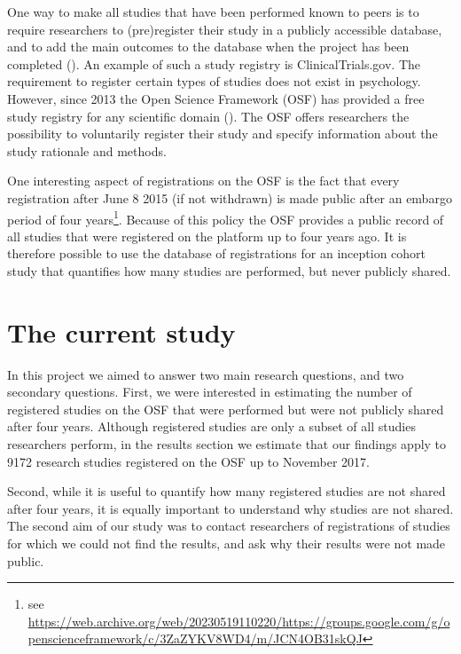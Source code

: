 \documentclass[
  ,man, a4paper,floatsintext]{apa6}
\begin{document}
One way to make all studies that have been performed known to peers is to require researchers to (pre)register their study in a publicly accessible database, and to add the main outcomes to the database when the project has been completed (). An example of such a study registry is ClinicalTrials.gov. The requirement to register certain types of studies does not exist in psychology. However, since 2013 the Open Science Framework (OSF) has provided a free study registry for any scientific domain (). The OSF offers researchers the possibility to voluntarily register their study and specify information about the study rationale and methods.

One interesting aspect of registrations on the OSF is the fact that every registration after June 8 2015 (if not withdrawn) is made public after an embargo period of four years\footnote{see \url{https://web.archive.org/web/20230519110220/https://groups.google.com/g/openscienceframework/c/3ZaZYKV8WD4/m/JCN4OB31skQJ}}. Because of this policy the OSF provides a public record of all studies that were registered on the platform up to four years ago. It is therefore possible to use the database of registrations for an inception cohort study that quantifies how many studies are performed, but never publicly shared.

\section{The current study}\label{the-current-study}

In this project we aimed to answer two main research questions, and two secondary questions. First, we were interested in estimating the number of registered studies on the OSF that were performed but were not publicly shared after four years. Although registered studies are only a subset of all studies researchers perform, in the results section we estimate that our findings apply to 9172 research studies registered on the OSF up to November 2017.

Second, while it is useful to quantify how many registered studies are not shared after four years, it is equally important to understand why studies are not shared. The second aim of our study was to contact researchers of registrations of studies for which we could not find the results, and ask why their results were not made public.
\end{document}
